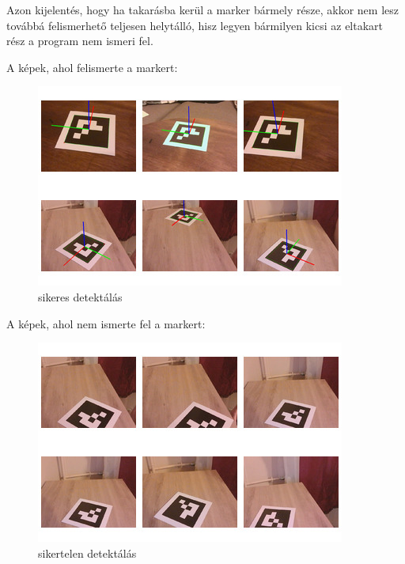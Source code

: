 Azon kijelentés, hogy ha takarásba kerül a marker bármely része, akkor nem lesz továbbá felismerhető teljesen helytálló, hisz legyen bármilyen kicsi az eltakart rész a program nem ismeri fel. 

A képek, ahol felismerte a markert:

\begin{figure}[htp]
    \centering
   	\includegraphics[width=6truecm, height=4.8truecm]{images/detect.jpg}
	\caption{sikeres detektálás}
\end{figure}


A képek, ahol nem ismerte fel a markert:
\begin{figure}[htp]
    \centering
   	\includegraphics[width=6truecm, height=4.8truecm]{images/not_detect.jpg}
	\caption{sikertelen detektálás}
\end{figure}

